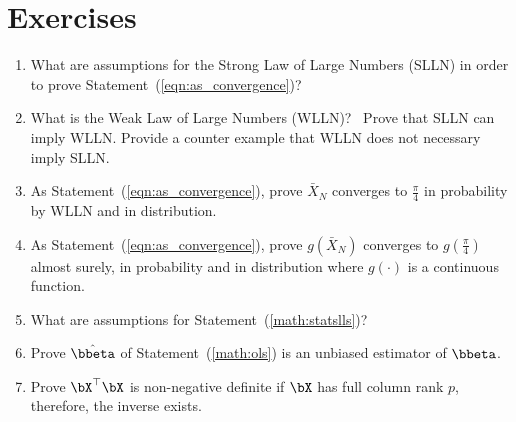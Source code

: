 \section{Exercises}
\label{sec:statistics_exercise}

\begin{enumerate}[label=\thechapter-\arabic*]
\item
What are assumptions for the Strong Law of Large Numbers (SLLN)
in order to prove Statement~(\ref{eqn:as_convergence})?

\item
What is the Weak Law of Large Numbers (WLLN)?~
Prove that SLLN can imply WLLN. Provide a counter example that
WLLN does not necessary imply SLLN.

\item
As Statement~(\ref{eqn:as_convergence}),
prove $\bar{X}_N$ converges to $\frac{\pi}{4}$ in probability by WLLN and
in distribution.

\item
As Statement~(\ref{eqn:as_convergence}),
prove $g(\bar{X}_N)$ converges to $g\left(\frac{\pi}{4}\right)$
almost surely, in probability and
in distribution where $g(\cdot)$ is a continuous function.

\item
What are assumptions for Statement~(\ref{math:statslls})?

\item
Prove $\hat{\bbeta}$ of Statement~(\ref{math:ols}) is an unbiased
estimator of $\bbeta$.

\item
Prove $\bX^\top\bX$ is non-negative definite if $\bX$ has full column rank $p$,
therefore, the inverse exists.

\end{enumerate}


